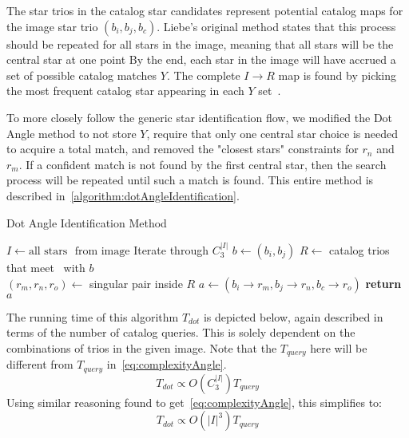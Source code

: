 The star trios in the catalog star candidates represent potential catalog maps for the image star trio $(b_i, b_j,
b_c)$.
Liebe's original method states that this process should be repeated for all stars in the image, meaning that all
stars will be the central star at one point
By the end, each star in the image will have accrued a set of possible catalog matches $Y$.
The complete $I \rightarrow R$ map is found by picking the most frequent catalog star appearing in each $Y$
set~\cite{DotAngle,AnalysisUncompensated}.

To more closely follow the generic star identification flow, we modified the Dot Angle method to not store $Y$,
require that only one central star choice is needed to acquire a total match, and removed the "closest stars"
constraints for $r_n$ and $r_m$.
If a confident match is not found by the first central star, then the search process will be repeated until such a
match is found.
This entire method is described in~\autoref{algorithm:dotAngleIdentification}.

\begin{algorithm}
    \caption{Dot Angle Identification Method} \label{algorithm:dotAngleIdentification}
    \begin{algorithmic}[1]
        \State $I \gets \text{all stars } \text{ from image}$
          \Comment Iterate through $C^{|I|}_3$
        \State $b \gets (b_i, b_j)$
        \State $R \gets $ catalog trios that meet~ with $b$
        \\
        \State $(r_m, r_n, r_o) \gets $ singular pair inside $R$
        \State $a \gets (b_i \rightarrow r_m, b_j \rightarrow r_n, b_c \rightarrow r_o)$
        \State \textbf{return} $a$
        \EndIf
        \EndFor
        \EndFor
        \EndFor
        \EndProcedure
    \end{algorithmic}
\end{algorithm}

The running time of this algorithm $T_{dot}$ is depicted below, again described in terms of the number of catalog
queries.
This is solely dependent on the combinations of trios in the given image.
Note that the $T_{query}$ here will be different from $T_{query}$ in~\autoref{eq:complexityAngle}.
\begin{equation}\label{eq:dotComplexityPart1}
    T_{dot} \propto O\left( C^{|I|}_3 \right) T_{query}
\end{equation}
Using similar reasoning found to get~\autoref{eq:complexityAngle}, this simplifies to:
\begin{equation}\label{eq:dotComplexity}
    T_{dot} \propto O\left( |I|^3 \right) T_{query}
\end{equation}

